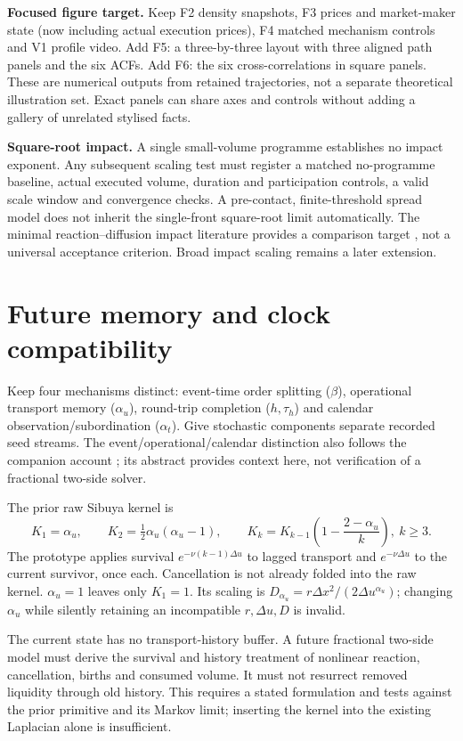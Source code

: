 \documentclass[11pt,a4paper]{article}
\newcommand{\du}{\Delta u}\newcommand{\dx}{\Delta x}
\begin{document}
\textbf{Focused figure target.} Keep F2 density snapshots, F3 prices and
market-maker state (now including actual execution prices), F4 matched
mechanism controls and V1 profile video. Add F5: a three-by-three layout with
three aligned path panels and the six ACFs. Add F6: the six cross-correlations
in square panels. These are numerical outputs from retained trajectories,
not a separate theoretical illustration set. Exact panels can share axes
and controls without adding a gallery of unrelated stylised facts.

\textbf{Square-root impact.} A single small-volume programme establishes no
impact exponent. Any subsequent scaling test must register a matched
no-programme baseline, actual executed volume, duration and participation
controls, a valid scale window and convergence checks. A pre-contact,
finite-threshold spread model does not inherit the single-front square-root
limit automatically. The minimal reaction--diffusion impact literature
provides a comparison target \cite{impact}, not a universal acceptance
criterion. Broad impact scaling remains a later extension.

\newpage
\section{Future memory and clock compatibility}
Keep four mechanisms distinct: event-time order splitting ($\beta$),
operational transport memory ($\alpha_u$), round-trip completion ($h,\tau_h$)
and calendar observation/subordination ($\alpha_t$). Give stochastic
components separate recorded seed streams. The event/operational/calendar
distinction also follows the companion account \cite{clocks}; its abstract
provides context here, not verification of a fractional two-side solver.

The prior raw Sibuya kernel is
\[
 K_1=\alpha_u,\qquad K_2=\tfrac12\alpha_u(\alpha_u-1),\qquad
 K_k=K_{k-1}\left(1-\frac{2-\alpha_u}{k}\right),\ k\geq3.
\]
The prototype applies survival $e^{-\nu(k-1)\du}$ to lagged transport
and $e^{-\nu\du}$ to the current survivor, once each. Cancellation is not
already folded into the raw kernel. $\alpha_u=1$ leaves only $K_1=1$.
Its scaling is $D_{\alpha_u}=r\dx^2/(2\du^{\alpha_u})$; changing
$\alpha_u$ while silently retaining an incompatible $r,\du,D$ is invalid.

The current state has no transport-history buffer. A future fractional
two-side model must derive the survival and history treatment of nonlinear
reaction, cancellation, births and consumed volume. It must not resurrect
removed liquidity through old history. This requires a stated formulation
and tests against the prior primitive and its Markov limit; inserting the
kernel into the existing Laplacian alone is insufficient.
\end{document}
